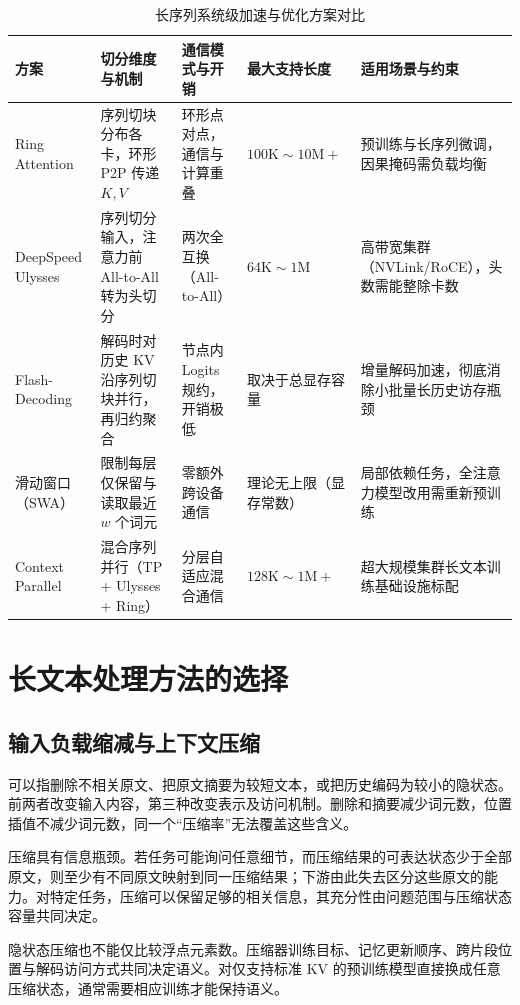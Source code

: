 \documentclass[../textbook.tex]{subfiles}
\begin{document}
\begin{table}[htbp]
\centering
\caption{长序列系统级加速与优化方案对比}\label{tab:lc-system}
\begin{tabularx}{\linewidth}{lXXXX}
\toprule
方案 & 切分维度与机制 & 通信模式与开销 & 最大支持长度 & 适用场景与约束\\\midrule
Ring Attention & 序列切块分布各卡，环形 P2P 传递 $K,V$ & 环形点对点，通信与计算重叠 & $100\text{K} \sim 10\text{M}+$ & 预训练与长序列微调，因果掩码需负载均衡\\
DeepSpeed Ulysses & 序列切分输入，注意力前 All-to-All 转为头切分 & 两次全互换（All-to-All） & $64\text{K} \sim 1\text{M}$ & 高带宽集群（NVLink/RoCE），头数需能整除卡数\\
Flash-Decoding & 解码时对历史 KV 沿序列切块并行，再归约聚合 & 节点内 Logits 规约，开销极低 & 取决于总显存容量 & 增量解码加速，彻底消除小批量长历史访存瓶颈\\
滑动窗口（SWA） & 限制每层仅保留与读取最近 $w$ 个词元 & 零额外跨设备通信 & 理论无上限（显存常数） & 局部依赖任务，全注意力模型改用需重新预训练\\
Context Parallel & 混合序列并行（TP + Ulysses + Ring） & 分层自适应混合通信 & $128\text{K} \sim 1\text{M}+$ & 超大规模集群长文本训练基础设施标配\\
\bottomrule
\end{tabularx}
\end{table}

\section{长文本处理方法的选择}

\subsection{输入负载缩减与上下文压缩}
可以指删除不相关原文、把原文摘要为较短文本，或把历史编码为较小的隐状态。前两者改变输入内容，第三种改变表示及访问机制。删除和摘要减少词元数，位置插值不减少词元数，同一个“压缩率”无法覆盖这些含义。

压缩具有信息瓶颈。若任务可能询问任意细节，而压缩结果的可表达状态少于全部原文，则至少有不同原文映射到同一压缩结果；下游由此失去区分这些原文的能力。对特定任务，压缩可以保留足够的相关信息，其充分性由问题范围与压缩状态容量共同决定。

隐状态压缩也不能仅比较浮点元素数。压缩器训练目标、记忆更新顺序、跨片段位置与解码访问方式共同决定语义。对仅支持标准 KV 的预训练模型直接换成任意压缩状态，通常需要相应训练才能保持语义。
\end{document}
